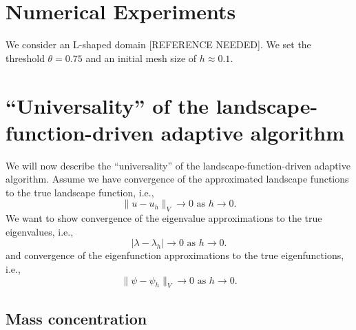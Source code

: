 \section{Numerical Experiments}

We consider an L-shaped domain [REFERENCE NEEDED].
We set the threshold \(\theta = 0.75\) and an initial mesh size of \(h \approx 0.1\).



\section{``Universality'' of the landscape-function-driven adaptive algorithm}

We will now describe the ``universality'' of the landscape-function-driven adaptive algorithm.
Assume we have convergence of the approximated landscape functions to the true landscape function, i.e.,
\begin{equation}
    \label{eq:convergence}
    \lVert u - u_h \rVert_{V} \to 0 \text{ as } h \to 0.
\end{equation}
We want to show convergence of the eigenvalue approximations to the true eigenvalues, i.e.,
\begin{equation}
    \label{eq:eigenvalue_convergence}
    \lvert \lambda - \lambda_h \rvert \to 0 \text{ as } h \to 0.
\end{equation}
and convergence of the eigenfunction approximations to the true eigenfunctions, i.e.,
\begin{equation}
    \label{eq:eigenfunction_convergence}
    \lVert \psi - \psi_h \rVert_{V} \to 0 \text{ as } h \to 0.
\end{equation}


\subsection{Mass concentration}

